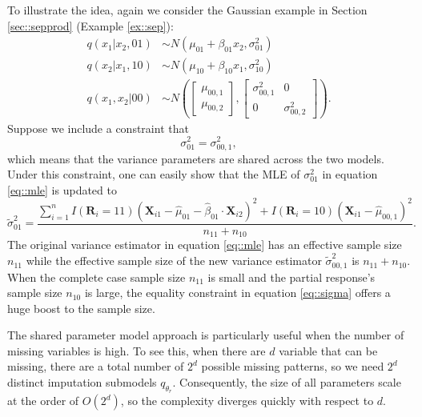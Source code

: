 \documentclass[aos, preprint]{imsart}
\theoremstyle{plain}
\theoremstyle{definition}
\let\hat\widehat
\let\tilde\widetilde
\newcommand{\bX}{\mathbf{X}}
\newcommand{\bR}{\mathbf{R}}
\begin{document}
\begin{appendix}
To illustrate the idea, again we consider the Gaussian example in Section \ref{sec::sepprod} (Example \ref{ex::sep}):
\begin{equation}
\begin{aligned}
q(x_1|x_2, 01) &\sim N(\mu_{01} + \beta_{01} x_2, \sigma^2_{01})\\
q(x_2|x_1, 10) &\sim N(\mu_{10} + \beta_{10} x_1, \sigma^2_{10})\\
q(x_1,x_2| 00) &\sim N\left(\begin{bmatrix}\mu_{00,1}\\
\mu_{00,2}
\end{bmatrix},
\begin{bmatrix}
\sigma_{00,1}^2 & 0\\
0 &\sigma_{00,2}^2
\end{bmatrix}\right).
\end{aligned}
\label{eq::shared}
\end{equation}
Suppose we include a constraint that 
\begin{equation}
\sigma^2_{01} = \sigma_{00,1}^2,
\label{eq::sigma}
\end{equation}
which means that the variance parameters are shared across the two models. 
Under this constraint, one can easily show that the MLE of $\sigma^2_{01}$ in equation \eqref{eq::mle} is updated to 
$$
\tilde \sigma^2_{01} = \frac{\sum_{i=1}^n I(\bR_i = 11) (\bX_{i1} - \hat\mu_{01} - \hat\beta_{01}\cdot \bX_{i2})^2 + I(\bR_i = 10) (\bX_{i1}- \hat \mu_{00,1})^2}{n_{11}+n_{10} }.
$$
The original variance estimator in equation \eqref{eq::mle} has an effective sample size $n_{11}$ while
the effective sample size of the new variance estimator $\tilde \sigma^2_{00,1}$ is $n_{11}+n_{10}$. 
When the complete case sample size $n_{11}$ is small and the partial response's sample size $n_{10}$ is large,
the equality constraint in equation \eqref{eq::sigma}
offers a huge boost to the sample size. 


The shared parameter model approach is particularly useful when the 
number of missing variables is high. 
To see this, when there are $d$ variable that can be missing,
there are a total number of $2^d$ possible missing patterns,
so we need  $2^d$ distinct imputation submodels  $q_{\theta_r}$. 
Consequently, the size of all parameters scale at the order of $O(2^d)$,
so the complexity diverges quickly with respect to $d$. 



\end{appendix}
\end{document}
